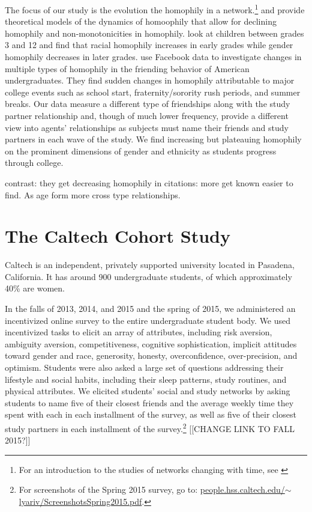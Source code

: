 \documentclass[12pt,letterpaper,english]{article}
\begin{document}
The focus of our study is the evolution the homophily in a network.\footnote{For an introduction to the studies of networks changing with time, see \cite{holme2012temporal}} \cite{bramoulle2012homophily} and \cite{tarbush2017social} provide theoretical models of the dynamics of homoophily that allow for declining homophily and non-monotonicities in homophily. \cite{shrum1988friendship} look at children between grades 3 and 12 and find that racial homophily increases in early grades while gender homophily decreases in later grades. \cite{overgoor2019} use Facebook data to investigate changes in multiple types of homophily in the friending behavior of American undergraduates. They find sudden changes in homophily attributable to major college events such as school start, fraternity/sorority rush periods, and summer breaks. Our data measure a different type of friendships along with the study partner relationship and, though of much lower frequency, provide a different view into agents' relationships as subjects must name their friends and study partners in each wave of the study. We find increasing but plateauing homophily on the prominent dimensions of gender and ethnicity as students progress through college.

\cite*{bramoulle2012homophily}   contrast: they get decreasing homophily in citations:   more get known easier to find.  As age form more cross type relationships.

\section{The Caltech Cohort Study}
\label{sec:caltech}

Caltech is an independent, privately supported university located in Pasadena, California. It has around 900 undergraduate students, of which approximately 40\% are women.

In the falls of 2013, 2014, and 2015 and the spring of 2015, we administered an incentivized online survey to the entire undergraduate student body. We used incentivized tasks to elicit an array of attributes, including risk aversion, ambiguity aversion, competitiveness, cognitive sophistication, implicit attitudes toward gender and race, generosity, honesty, overconfidence, over-precision, and optimism. Students were also asked a large set of questions addressing their lifestyle and social habits, including their sleep patterns, study routines, and physical attributes. We elicited students' social and study networks by asking students to name five of their closest friends and the average weekly time they spent with each in each installment of the survey, as well as five of their closest study partners in each installment of the survey.\footnote{For screenshots of the Spring 2015 survey, go to: \href{http://people.hss.caltech.edu/~lyariv/papers/ScreenshotsSpring2015.pdf}{{\color{blue}people.hss.caltech.edu/$\sim $lyariv/ScreenshotsSpring2015.pdf}}.} [[CHANGE LINK TO FALL 2015?]]
\end{document}

